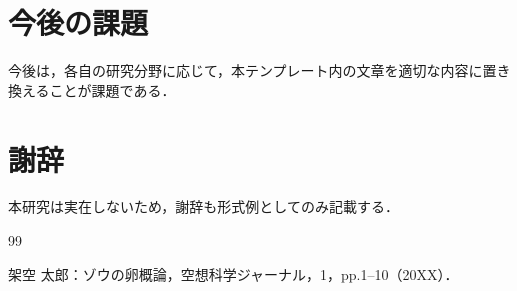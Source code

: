 \documentclass{HUS_abstract}
\begin{document}
\section*{今後の課題}
今後は，各自の研究分野に応じて，本テンプレート内の文章を適切な内容に置き換えることが課題である．

\section*{謝辞}
本研究は実在しないため，謝辞も形式例としてのみ記載する．

\begin{thebibliography}{99}

架空 太郎：ゾウの卵概論，空想科学ジャーナル，1，pp.1--10（20XX）．

\end{thebibliography}

\end{document}
